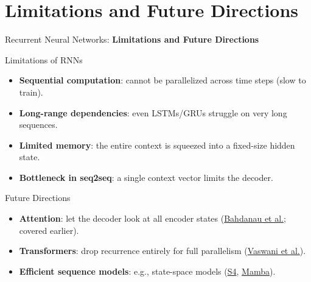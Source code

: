 \section{Limitations and Future Directions}
\begin{frame}{}
    \LARGE Recurrent Neural Networks: \textbf{Limitations and Future Directions}
\end{frame}

\begin{frame}{Limitations of RNNs}
    \begin{itemize}
        \item \textbf{Sequential computation}: cannot be parallelized across time steps (slow to train).
        \item \textbf{Long-range dependencies}: even LSTMs/GRUs struggle on very long sequences.
        \item \textbf{Limited memory}: the entire context is squeezed into a fixed-size hidden state.
        \item \textbf{Bottleneck in seq2seq}: a single context vector limits the decoder.
    \end{itemize}
\end{frame}

\begin{frame}{Future Directions}
    \begin{itemize}
        \item \textbf{Attention}: let the decoder look at all encoder states (\href{https://arxiv.org/abs/1409.0473}{Bahdanau et al.}; covered earlier).
        \item \textbf{Transformers}: drop recurrence entirely for full parallelism (\href{https://arxiv.org/abs/1706.03762}{Vaswani et al.}).
        \item \textbf{Efficient sequence models}: e.g., state-space models (\href{https://arxiv.org/abs/2111.00396}{S4}, \href{https://arxiv.org/abs/2312.00752}{Mamba}).
    \end{itemize}
\end{frame}

